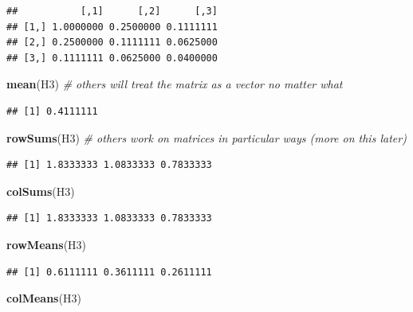 \documentclass[]{article}
\newenvironment{Shaded}{\begin{snugshade}}{\end{snugshade}}
\newcommand{\KeywordTok}[1]{\textcolor[rgb]{0.13,0.29,0.53}{\textbf{#1}}}
\newcommand{\CommentTok}[1]{\textcolor[rgb]{0.56,0.35,0.01}{\textit{#1}}}
\newcommand{\NormalTok}[1]{#1}
\begin{document}
\begin{verbatim}
##           [,1]      [,2]      [,3]
## [1,] 1.0000000 0.2500000 0.1111111
## [2,] 0.2500000 0.1111111 0.0625000
## [3,] 0.1111111 0.0625000 0.0400000
\end{verbatim}

\begin{Shaded}
\begin{Highlighting}[]
\KeywordTok{mean}\NormalTok{(H3) }\CommentTok{# others will treat the matrix as a vector no matter what}
\end{Highlighting}
\end{Shaded}

\begin{verbatim}
## [1] 0.4111111
\end{verbatim}

\begin{Shaded}
\begin{Highlighting}[]
\KeywordTok{rowSums}\NormalTok{(H3) }\CommentTok{# others work on matrices in particular ways (more on this later)}
\end{Highlighting}
\end{Shaded}

\begin{verbatim}
## [1] 1.8333333 1.0833333 0.7833333
\end{verbatim}

\begin{Shaded}
\begin{Highlighting}[]
\KeywordTok{colSums}\NormalTok{(H3)}
\end{Highlighting}
\end{Shaded}

\begin{verbatim}
## [1] 1.8333333 1.0833333 0.7833333
\end{verbatim}

\begin{Shaded}
\begin{Highlighting}[]
\KeywordTok{rowMeans}\NormalTok{(H3)}
\end{Highlighting}
\end{Shaded}

\begin{verbatim}
## [1] 0.6111111 0.3611111 0.2611111
\end{verbatim}

\begin{Shaded}
\begin{Highlighting}[]
\KeywordTok{colMeans}\NormalTok{(H3)}
\end{Highlighting}
\end{Shaded}
\end{document}
